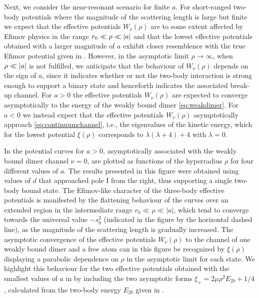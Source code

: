 Next, we consider the near-resonant scenario for finite $a$. For short-ranged two-body potentials where the magnitude of the scattering length is large but finite we expect that the effective potentials $W_{\nu}(\rho)$ are to some extent affected by Efimov physics in the range $r_0 \ll \rho \ll \lvert a\rvert$ and that the lowest effective potentials obtained with a larger magnitude of $a$ exhibit closer resemblence with the true Efimov potential given in . However, in the asymptotic limit $\rho \rightarrow \infty$, when $\rho \ll \lvert a\rvert$ is not fulfilled, we anticipate that the behaviour of $W_{\nu}(\rho)$ depends on the sign of $a$, since it indicates whether or not the two-body interaction is strong enough to support a binary state and henceforth indicates the associated break-up channel. For $a>0$ the effective potentials $W_{\nu}(\rho)$ are expected to converge asymptotically to the energy of the weakly bound dimer \eqref{eq:weakdimer}. For $a<0$ we instead expect that the effective potentials $W_{\nu}(\rho)$ asymptotically approach \eqref{eq:continuumchannel}, i.e., the eigenvalues of the kinetic energy, which for the lowest potential $\xi(\rho)$ corresponds to $\lambda(\lambda + 4) + 4$ with $\lambda = 0$.

In  the potential curves for $a>0$, asymptotically associated with the weakly bound dimer channel $\nu = 0$, are plotted as functions of the hyperradius $\rho$ for four different values of $a$. The results presented in this figure were obtained using values of $d$ that approached pole $\mathrm{I}$ from the right, thus supporting a single two-body bound state. The Efimov-like character of the three-body effective potentials is manifested by the flattening behaviour of the curves over an extended region in the intermediate range $r_0 \ll \rho \ll |a|$, which tend to converge towards the universal value $-s_0^2$ (indicated in the figure by the horizontal dashed line), as the magnitude of the scattering length is gradually increased. The asymptotic convergence of the effective potentials $W_{\nu}(\rho)$ to the channel of one weakly bound dimer and a free atom can in this figure be recognized by $\xi(\rho)$ displaying a parabolic dependence on $\rho$ in the asymptotic limit for each state. We highlight this behaviour for the two effective potentials obtained with the smallest values of $a$ in  by including the two asymptotic forms $\xi_+ = 2\mu \rho^2 E_{2b} + 1/4$, calculated from the two-body energy $E_{2b}$ given in .   


